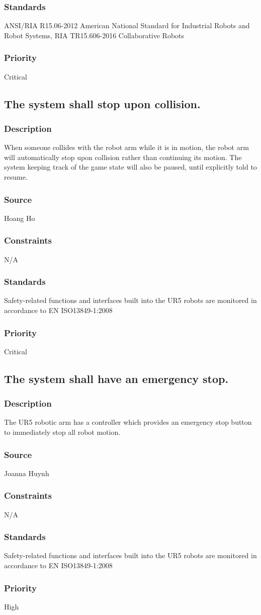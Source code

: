 \subsubsection{Standards}
ANSI/RIA R15.06-2012 American National Standard for Industrial Robots and Robot Systems, RIA TR15.606-2016 Collaborative Robots \cite{UR5manual}
\subsubsection{Priority}
Critical

\subsection{The system shall stop upon collision.}
\subsubsection{Description}
When someone collides with the robot arm while it is in motion, the robot arm will automatically stop upon collision rather than continuing its motion. The system keeping track of the game state will also be paused, until explicitly told to resume.
\subsubsection{Source}
Hoang Ho
\subsubsection{Constraints}
N/A
\subsubsection{Standards}
Safety-related functions and interfaces built into the UR5 robots are monitored in accordance to EN ISO13849-1:2008 \cite{UR5manual}
\subsubsection{Priority}
Critical

\subsection{The system shall have an emergency stop.}
\subsubsection{Description}
The UR5 robotic arm has a controller which provides an emergency stop button to immediately stop all robot motion.
\subsubsection{Source}
Joanna Huynh
\subsubsection{Constraints}
N/A
\subsubsection{Standards}
Safety-related functions and interfaces built into the UR5 robots are monitored in accordance to EN ISO13849-1:2008
\subsubsection{Priority}
High
